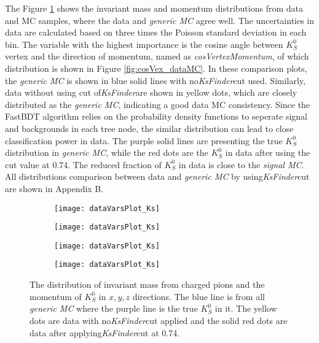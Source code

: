  The Figure \ref{fig:ksvalid_1} shows the invariant mass and momentum distributions from data and MC samples, where the data and \textit{generic MC} agree well. The uncertainties in data are calculated based on three times the Poisson standard deviation in each bin. The variable with the highest importance is the cosine angle between $K_S^0$ vertex and the direction of momentum, named as \textit{cosVertexMomentum}, of which distribution is shown in Figure \ref{fig:cosVex_dataMC}. In these comparison plots, the \textit{generic MC} is shown in blue solid lines with no\textit{KsFinder}cut used. Similarly, data without using cut of\textit{KsFinder}are shown in yellow dots, which are closely distributed as the \textit{generic MC}, indicating a good data MC consistency. Since the FastBDT algorithm relies on the probability density functions to seperate signal and backgrounds in each tree node, the similar distribution can lead to close classification power in data. The purple solid lines are presenting the true $K_S^0$ distribution in \textit{generic MC}, while the red dots are the $K_S^0$ in data after using the cut value at 0.74. The reduced fraction of $K_S^0$ in data  is close to the \textit{signal MC}. All distributions comparison between data and \textit{generic MC} by using\textit{KsFinder}cut are shown in Appendix B.

\begin{figure}[htpb]
\begin{subfigure}{0.5\linewidth}
\texttt{[image: dataVarsPlot\_Ks]}
\end{subfigure}
\begin{subfigure}{0.5\linewidth}
\texttt{[image: dataVarsPlot\_Ks]}
\end{subfigure}
\bigskip
\begin{subfigure}{0.5\linewidth}
\texttt{[image: dataVarsPlot\_Ks]}
\end{subfigure}
\begin{subfigure}{0.5\linewidth}
\texttt{[image: dataVarsPlot\_Ks]}
\end{subfigure}
\caption{The distribution of invariant mass from charged pions and the momentum of $K_S^0$ in $x,y,z$ directions. The blue line is from all \textit{generic MC} where the purple line is the true $K_S^0$ in it. The yellow dots are data with no\textit{KsFinder}cut applied and the solid red dots are data after applying\textit{KsFinder}cut at 0.74.}
\label{fig:ksvalid_1}
\end{figure}

